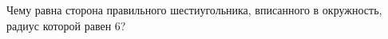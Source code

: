 \begin{ex}
	\begin{condition}
		Чему равна сторона правильного шестиугольника, вписанного в окружность, радиус которой равен \( 6\)?
	\end{condition}
\end{ex}